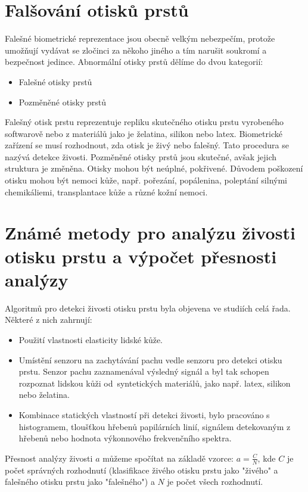 \section{Falšování otisků prstů}
Falešné biometrické reprezentace jsou obecně velkým nebezpečím, protože umožňují vydávat se zločinci za někoho jiného a tím narušit soukromí a bezpečnost jedince. Abnormální otisky prstů dělíme do dvou kategorií:
\begin{itemize}
    \item Falešné otisky prstů
    \item Pozměněné otisky prstů
\end{itemize}
Falešný otisk prstu reprezentuje repliku skutečného otisku prstu vyrobeného softwarově nebo z materiálů jako je želatina, silikon nebo latex. Biometrické zařízení se musí rozhodnout, zda otisk je živý nebo falešný. Tato procedura se nazývá detekce živosti.
Pozměněné otisky prstů jsou skutečné, avšak jejich struktura je změněna. Otisky mohou být neúplné, pokřivené. Důvodem poškození otisku mohou být nemoci kůže, např. pořezání, popálenina, poleptání silnými chemikáliemi, transplantace kůže a různé kožní nemoci.\cite{Petrovici}
\section{Známé metody pro analýzu živosti otisku prstu a výpočet přesnosti analýzy}
Algoritmů pro detekci živosti otisku prstu byla objevena ve studiích celá řada. Některé z nich zahrnují:\cite{AbhiskekStudy}
\begin{itemize}
    \item Použití vlastnosti elasticity lidské kůže.
    \item Umístění senzoru na zachytávání pachu vedle senzoru pro detekci otisku prstu. Senzor pachu zaznamenával výsledný signál a byl tak schopen rozpoznat lidskou kůži od~syntetických materiálů, jako např. latex, silikon nebo želatina.
    \item Kombinace statických vlastností při detekci živosti, bylo pracováno s histogramem, tloušťkou hřebenů papilárních linií, signálem detekovaným z hřebenů nebo hodnota výkonnového frekvenčního spektra.
    
\end{itemize}

Přesnost analýzy živosti $a$ můžeme spočítat na základě vzorce:
$a = \frac{C}{N}$, kde $C$ je počet správných rozhodnutí (klasifikace živého otisku prstu jako "živého" a falešného otisku prstu jako "falešného") a $N$ je počet všech rozhodnutí.\cite{GottschlichStudy}



